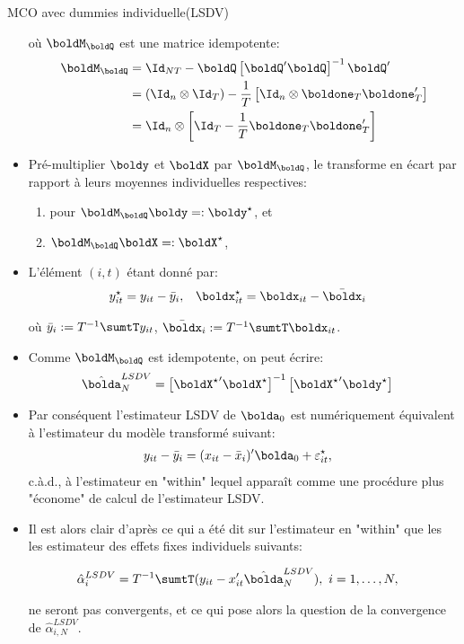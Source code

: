 \begin{frame}[allowframebreaks]{MCO avec dummies individuelle(LSDV)}
\begin{itemize}
    où  $\boldM_\boldQ$ est une matrice idempotente:
\begin{align*}
\boldM_\boldQ &=\Id_{NT} - \boldQ\left[\boldQ^\prime\boldQ\right]^{-1}\boldQ^\prime\\
&= \left(\Id_n\otimes \Id_T\right) - \frac{1}{T}\left[\Id_n \otimes\boldone_T 
\boldone_T^\prime\right]\\
&= \Id_n\otimes\left[\Id_T -  \frac{1}{T} \boldone_T \boldone_T^\prime\right]
\end{align*}

\item Pré-multiplier $\boldy$ et $\boldX$ par $\boldM_\boldQ$, 
le transforme en écart par rapport à leurs moyennes individuelles respectives:
\begin{enumerate}[$\star$]
\item pour $\boldM_\boldQ \boldy =: \boldy^{\star}$, et
\item $\boldM_\boldQ \boldX =: \boldX^{\star}$, 
\end{enumerate}
\item L'élément $(i, t)$ étant donné par:
\begin{align*}
    y^{\star}_{it} = y_{it}-\bar{y}_i, &\quad  \boldx^{\star}_{it} = \boldx_{it}-\bar{\boldx}_i
 \end{align*}
    
    où $\bar{y}_i:= T^{-1}\sumtT y_{it}$, $\bar{\boldx}_i:= T^{-1}\sumtT \boldx_{it}$. 

\item Comme $\boldM_\boldQ$ est idempotente, on peut écrire:
\begin{align*}
\hat{\bolda}^{LSDV}_N  &=\left[ {\boldX^{\star}}^\prime\boldX^{\star}\right]^{-1}\left[{\boldX^{\star}}^\prime\boldy^{\star}\right]
\end{align*}

\item Par conséquent l'estimateur LSDV de $\bolda_0$ est numériquement équivalent à l'estimateur du modèle transformé suivant:
\begin{align*}
y_{it}- \bar{y}_i &= (x_{it}- \bar{x}_i)^\prime\bolda_0+ \varepsilon_{it}^{\star},
\end{align*}
c.à.d., à l'estimateur en "within" lequel apparaît comme une procédure plus "économe" de calcul de l'estimateur LSDV.

\item Il est alors clair d'après ce qui a été dit sur l'estimateur en "within" que les les estimateur des effets fixes individuels 
suivants:

\begin{align*}
    \hat{\alpha}_i^{LSDV} &= T^{-1}\sumtT(y_{it} - x_{it}^\prime\hat{\bolda}^{LSDV}_N), \ i=1, \ldots, N,
\end{align*}

ne seront pas convergents, et ce qui pose alors la question de la convergence de  $\hat{\alpha}_{i, N}^{LSDV}$.

    \end{itemize}
    \end{frame}

